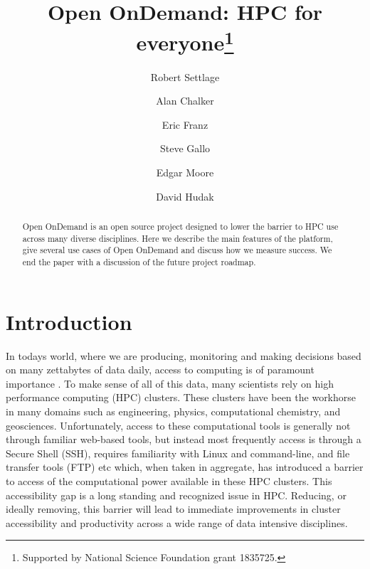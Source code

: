 \documentclass[runningheads]{llncs}
\begin{document}
%
\title{Open OnDemand: HPC for everyone\thanks{Supported by National Science Foundation grant 1835725.}}
%
%
\author{Robert Settlage \and
Alan Chalker \and
Eric Franz \and
Steve Gallo \and
Edgar Moore \and
David Hudak}
%
%
%
\maketitle              %
%
\begin{abstract}
Open OnDemand is an open source project designed to lower the barrier to HPC use across many diverse disciplines.  Here we describe the main features of the platform, give several use cases of Open OnDemand and discuss how we measure success.  We end the paper with a discussion of the future project roadmap.

\end{abstract}
%
%
%
\section{Introduction}
In today\textquotesingle s world, where we are producing, monitoring and making decisions based on many zettabytes of data daily, access to computing is of paramount importance\cite{ref_proc1} .  To make sense of all of this data, many scientists rely on high performance computing (HPC) clusters.  These clusters have been the workhorse in many domains such as engineering, physics, computational chemistry, and geosciences.  Unfortunately, access to these computational tools is generally not through familiar web-based tools, but instead most frequently access is through a Secure Shell (SSH), requires familiarity with Linux and command-line, and file transfer tools (FTP) etc which, when taken in aggregate, has introduced a barrier to access of the computational power available in these HPC clusters.  This accessibility gap is a long standing and recognized issue in HPC.  Reducing, or ideally removing, this barrier will lead to immediate improvements in cluster accessibility and productivity across a wide range of data intensive disciplines.  
\end{document}
